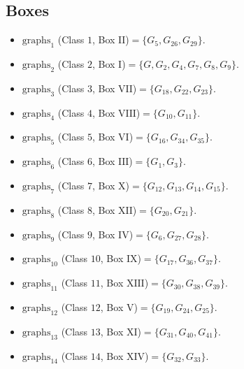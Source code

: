\subsection*{Boxes}\label{app:preaut-boxes}
\begin{itemize}[leftmargin=*]
\item $\mathrm{graphs}_{1}$ (Class $1$, Box $\mathrm{II}$)$=\{G_{5}, G_{26}, G_{29}\}$.
\item $\mathrm{graphs}_{2}$ (Class $2$, Box $\mathrm{I}$)$=\{G, G_{2}, G_{4}, G_{7}, G_{8}, G_{9}\}$.
\item $\mathrm{graphs}_{3}$ (Class $3$, Box $\mathrm{VII}$)$=\{G_{18}, G_{22}, G_{23}\}$.
\item $\mathrm{graphs}_{4}$ (Class $4$, Box $\mathrm{VIII}$)$=\{G_{10}, G_{11}\}$.
\item $\mathrm{graphs}_{5}$ (Class $5$, Box $\mathrm{VI}$)$=\{G_{16}, G_{34}, G_{35}\}$.
\item $\mathrm{graphs}_{6}$ (Class $6$, Box $\mathrm{III}$)$=\{G_{1}, G_{3}\}$.
\item $\mathrm{graphs}_{7}$ (Class $7$, Box $\mathrm{X}$)$=\{G_{12}, G_{13}, G_{14}, G_{15}\}$.
\item $\mathrm{graphs}_{8}$ (Class $8$, Box $\mathrm{XII}$)$=\{G_{20}, G_{21}\}$.
\item $\mathrm{graphs}_{9}$ (Class $9$, Box $\mathrm{IV}$)$=\{G_{6}, G_{27}, G_{28}\}$.
\item $\mathrm{graphs}_{10}$ (Class $10$, Box $\mathrm{IX}$)$=\{G_{17}, G_{36}, G_{37}\}$.
\item $\mathrm{graphs}_{11}$ (Class $11$, Box $\mathrm{XIII}$)$=\{G_{30}, G_{38}, G_{39}\}$.
\item $\mathrm{graphs}_{12}$ (Class $12$, Box $\mathrm{V}$)$=\{G_{19}, G_{24}, G_{25}\}$.
\item $\mathrm{graphs}_{13}$ (Class $13$, Box $\mathrm{XI}$)$=\{G_{31}, G_{40}, G_{41}\}$.
\item $\mathrm{graphs}_{14}$ (Class $14$, Box $\mathrm{XIV}$)$=\{G_{32}, G_{33}\}$.
\end{itemize}

